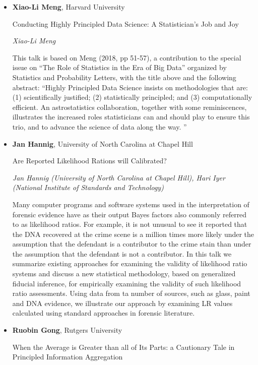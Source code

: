\begin{itemize}
\item \textbf{Xiao-Li Meng}, Harvard University

Conducting Highly Principled Data Science: A Statistician's Job and Joy

\emph{\footnotesize Xiao-Li Meng}

This talk is based on Meng (2018, pp 51-57), a contribution to the special issue on ``The Role of Statistics in the Era of Big Data'' organized by Statistics and Probability Letters, with the title above and the following abstract:  ``Highly Principled Data Science insists on methodologies that are: (1) scientifically justified; (2) statistically principled; and (3) computationally efficient. An astrostatistics collaboration, together with some reminiscences, illustrates the increased roles statisticians can and should play to ensure this trio, and to advance the science of data along the way. ''

\item \textbf{Jan Hannig}, University of North Carolina at Chapel Hill

Are Reported Likelihood Rations will Calibrated?

\emph{\footnotesize Jan Hannig (University of North Carolina at Chapel Hill), Hari Iyer (National Institute of Standards and Technology)}

Many computer programs and software systems used in the interpretation of forensic evidence have as their output Bayes factors also commonly referred to as likelihood ratios. For example, it is not unusual to see it reported that the DNA recovered at the crime scene is a million times more likely under the assumption that the defendant is a contributor to the crime stain than under the assumption that the defendant is not a contributor. In this talk we summarize existing approaches for examining the validity of likelihood ratio systems and discuss a new statistical methodology, based on generalized fiducial inference, for empirically examining the validity of such likelihood ratio assessments. Using data from ta number of sources, such as glass, paint and DNA evidence, we illustrate our approach by examining LR values calculated using standard approaches in forensic literature.

\item \textbf{Ruobin Gong}, Rutgers University

When the Average is Greater than all of Its Parts: a Cautionary Tale in Principled Information Aggregation


\end{itemize}

